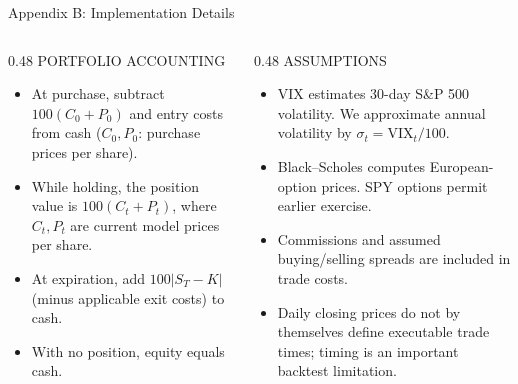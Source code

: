 \documentclass[10pt,aspectratio=169]{beamer}
\newcommand{\eyebrow}[1]{{\footnotesize\color{GraphGray}#1}\par\vspace{0.07cm}}
\begin{document}
\begin{frame}{Appendix B: Implementation Details}
\vspace{0.07cm}
\begin{columns}[T,onlytextwidth]
\begin{column}{0.48\textwidth}
\eyebrow{PORTFOLIO ACCOUNTING}
\begin{itemize}\setlength{\itemsep}{0.12cm}
\item At purchase, subtract $100(C_0+P_0)$ and entry costs from cash ($C_0,P_0$: purchase prices per share).
\item While holding, the position value is $100(C_t+P_t)$, where $C_t,P_t$ are current model prices per share.
\item At expiration, add $100|S_T-K|$ (minus applicable exit costs) to cash.
\item With no position, equity equals cash.
\end{itemize}
\end{column}
\begin{column}{0.48\textwidth}
\eyebrow{ASSUMPTIONS}
\begin{itemize}\setlength{\itemsep}{0.12cm}
\item VIX estimates 30-day S\&P 500 volatility. We approximate annual volatility by $\sigma_t=\mathrm{VIX}_t/100$.
\item Black--Scholes computes European-option prices. SPY options permit earlier exercise.
\item Commissions and assumed buying/selling spreads are included in trade costs.
\item Daily closing prices do not by themselves define executable trade times; timing is an important backtest limitation.
\end{itemize}
\end{column}
\end{columns}
\vfill

\end{frame}
\end{document}
